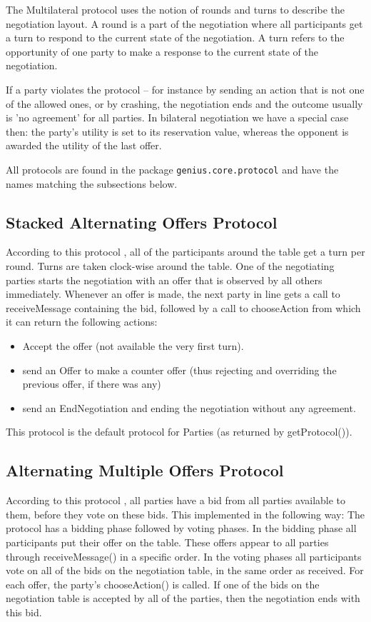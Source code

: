 \documentclass[]{article}
\begin{document}
 The Multilateral protocol uses the notion of rounds and turns to describe the negotiation layout. A round is a part of the negotiation where all participants get a turn to respond to the current state of the negotiation. A turn refers to the opportunity of one party to make a response to the current state of the negotiation. 
  
If a party violates the protocol -- for instance by sending an action that is not one of the allowed ones, or by crashing, the negotiation ends and the outcome usually is 'no agreement' for all parties.  In bilateral negotiation we have a special case then: the party's utility is set to its reservation value, whereas the opponent is awarded the utility of the last offer.

All protocols are found in the package \verb|genius.core.protocol| and have the names matching the subsections below.


\subsection{Stacked Alternating Offers Protocol}
According to this protocol \cite{MultilateralOffersProtocols} , all of the participants around the table get a turn per round. Turns are taken clock-wise around the table. One of the negotiating parties starts the negotiation with an offer that is observed by all others immediately. Whenever an offer is made, the next party in line gets a call to receiveMessage containing the bid, followed by a call to chooseAction from which it can return the following actions:
\begin{itemize}
\item Accept the offer (not available the very first turn). 
\item send an Offer to make a counter offer (thus rejecting and overriding the previous offer, if there was any) 
\item send an EndNegotiation and ending the negotiation without any agreement.
\end{itemize}

This protocol is the default protocol for Parties (as returned by getProtocol()).


\subsection{Alternating Multiple Offers Protocol}
According to this protocol \cite{MultilateralOffersProtocols}, all parties have a bid from all parties available to them, before they vote on these bids. This implemented in the following way: The protocol has a bidding phase followed by voting phases. In the bidding phase all participants put their offer on the table. These offers appear to all parties through receiveMessage() in a specific order. In the voting phases all participants vote on all of the bids on the negotiation table, in the same order as received. For each offer, the party's chooseAction() is called. If one of the bids on the negotiation table is accepted by all of the parties, then the negotiation ends with this bid. 
\end{document}
